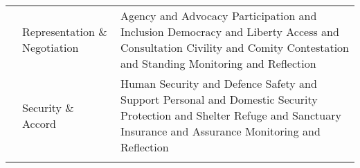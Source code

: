 \begin{table}[th]
\begin{center}
\begin{tabular}{ >{\raggedright\arraybackslash}p{} >{\raggedright\arraybackslash}p{} >{\raggedright\arraybackslash}p{} }
  & Representation \& Negotiation & Agency and Advocacy \linebreak Participation and Inclusion \linebreak Democracy and Liberty \linebreak Access and Consultation \linebreak Civility and Comity \linebreak Contestation and Standing \linebreak Monitoring and Reflection \linebreak \\
  & Security \& Accord & Human Security and Defence \linebreak Safety and Support \linebreak Personal and Domestic Security \linebreak Protection and Shelter \linebreak Refuge and Sanctuary \linebreak Insurance and Assurance \linebreak Monitoring and Reflection \\
\hline
\label{tbl:incomesByUfarmens2}
\end{tabular}
\end{center}
\end{table}

